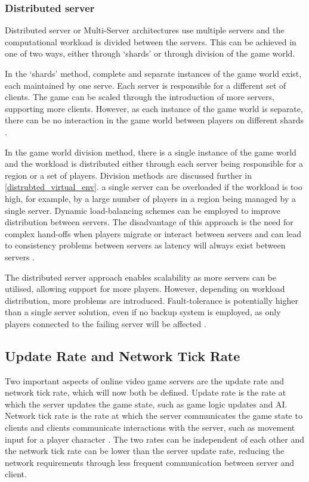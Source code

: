 \subsubsection{Distributed server}
Distributed server or Multi-Server architectures use multiple servers and the computational workload is divided between the servers. This can be achieved in one of two ways, either through `shards' or through division of the game world. 

In the `shards' method, complete and separate instances of the game world exist, each maintained by one serve. Each server is responsible for a different set of clients. The game can be scaled through the introduction of more servers, supporting more clients. However, as each instance of the game world is separate, there can be no interaction in the game world between players on different shards \cite{P2PSurvey}.

In the game world division method, there is a single instance of the game world and the workload is distributed either through each server being responsible for a region or a set of players. Division methods are discussed further in \ref{distrubted_virtual_env}. 
a single server can be overloaded if the workload is too high, for example, by a large number of players in a region being managed by a single server. Dynamic load-balancing schemes can be employed to improve distribution between servers. The disadvantage of this approach is the need for complex hand-offs when players migrate or interact between servers and can lead to consistency problems between servers as latency will always exist between servers \cite{P2PSurvey}.

The distributed server approach enables scalability as more servers can be utilised, allowing support for more players. However, depending on workload distribution, more problems are introduced. Fault-tolerance is potentially higher than a single server solution, even if no backup system is employed, as only players connected to the failing server will be affected \cite{P2PSurvey}.


\subsection{Update Rate and Network Tick Rate} \label{update-rate-test-values}

Two important aspects of online video game servers are the update rate and network tick rate, which will now both be defined. Update rate is the rate at which the server updates the game state, such as game logic updates and AI. Network tick rate is the rate at which the server communicates the game state to clients and clients communicate interactions with the server, such as movement input for a player character \cite{pisan2004challenges}. The two rates can be independent of each other and the network tick rate can be lower than the server update rate, reducing the network requirements through less frequent communication between server and client.

